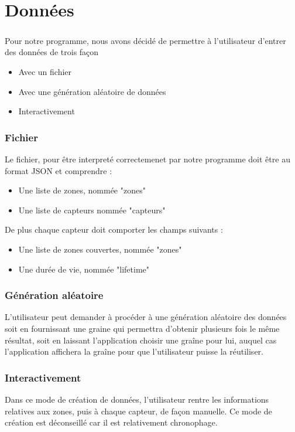\chapter{Données}

\paragraph{}
    Pour notre programme, nous avons décidé de permettre à l'utilisateur
    d'entrer des données de trois façon
    \begin{itemize}
        \item Avec un fichier
        \item Avec une génération aléatoire de données
        \item Interactivement
    \end{itemize}

    \subsection{Fichier}
        Le fichier, pour être interpreté correctemenet par notre programme
        doit être au format JSON et comprendre :
        \begin{itemize}
            \item Une liste de zones, nommée "zones"
            \item Une liste de capteurs nommée "capteurs"
        \end{itemize}
        De plus chaque capteur doit comporter les champs suivants :
        \begin{itemize}
            \item Une liste de zones couvertes, nommée "zones"
            \item Une durée de vie, nommée "lifetime"
        \end{itemize}

    \subsection{Génération aléatoire}
        L'utilisateur peut demander à procéder à une génération aléatoire des
        données soit en fournissant une graine qui permettra d'obtenir plusieurs
        fois le même résultat, soit en laissant l'application choisir une graîne
        pour lui, auquel cas l'application affichera la graîne pour que
        l'utilisateur puisse la réutiliser.


    \subsection{Interactivement}
        Dans ce mode de création de données, l'utilisateur rentre les
        informations relatives aux zones, puis à chaque capteur, de façon
        manuelle. Ce mode de création est déconseillé car il est relativement
        chronophage.
